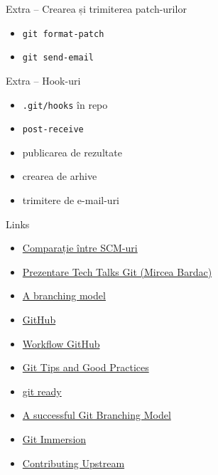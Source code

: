 \documentclass{beamer}
\begin{document}
\begin{frame}{Extra -- Crearea și trimiterea patch-urilor}
  \begin{itemize}
    \item \texttt{git format-patch}
    \item \texttt{git send-email}
  \end{itemize}
\end{frame}

\begin{frame}{Extra -- Hook-uri}
  \begin{itemize}
    \item \texttt{.git/hooks} în repo
    \item \texttt{post-receive}
    \item publicarea de rezultate
    \item crearea de arhive
    \item trimitere de e-mail-uri
  \end{itemize}
\end{frame}

\begin{frame}[label=l]{Links}
  \begin{itemize}
    \item \href{http://en.wikipedia.org/wiki/Comparison_of_revision_control_software}{Comparație între SCM-uri}
    \item \href{http://talks.rosedu.org/prezentari/prezentarea03}{Prezentare
    Tech Talks Git (Mircea Bardac)}
    \item \href{http://nvie.com/posts/a-successful-git-branching-model/}{A
    branching model}
    \item \href{http://github.com}{GitHub}
    \item
    \href{http://www.eqqon.com/index.php/Collaborative_Github_Workflow}{Workflow
    GitHub}
    \item
    \href{http://techblog.rosedu.org/git-good-practices.html}{Git Tips and
    Good Practices}
    \item
    \href{http://gitready.com/}{git ready}
    \item
    \href{http://nvie.com/posts/a-successful-git-branching-model/}{A
    successful Git Branching Model}
    \item
    \href{http://gitimmersion.com/}{Git Immersion}
    \item
    \href{http://techblog.rosedu.org/contributing-upstream.html}{Contributing
    Upstream}
  \end{itemize}
\end{frame}
\end{document}
